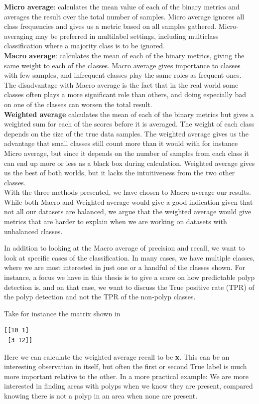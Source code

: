 \textbf{Micro average}: calculates the mean value of each of the binary metrics and averages the result over the total number of samples. 
Micro average ignores all class frequencies and gives us a metric based on all samples gathered. Micro-averaging may be preferred in multilabel settings, including multiclass classification where a majority class is to be ignored.\\

\textbf{Macro average}: calculates the mean of each of the binary metrics, giving the same weight to each of the classes. Macro average gives importance to classes with few samples, and infrequent classes play the same roles as frequent ones. The disadvantage with Macro average is the fact that in the real world some classes often plays a more significant role than others, and doing especially bad on one of the classes can worsen the total result. \\

\textbf{Weighted average} calculates the mean of each of the binary metrics but gives a weighted sum for each of the scores before it is averaged. 
The weight of each class depends on the size of the true data samples.
The weighted average gives us the advantage that small classes still count more than it would with for instance Micro average, but since it depends on the number of samples from each class it can end up more or less as a black box during calculation.
Weighted average gives us the best of both worlds, but it lacks the intuitiveness from the two other classes. \\

With the three methods presented, we have chosen to Macro average our results. While both Macro and Weighted average would give a good indication given that not all our datasets are balanced, we argue that the weighted average would give metrics that are harder to explain when we are working on datasets with unbalanced classes.

In addition to looking at the Macro average of precision and recall, we want to look at specific cases of the classification.  In many cases, we have multiple classes, where we are most interested in just one or a handful of the classes shown. 
For instance, a focus we have in this thesis is to give a score on how predictable polyp detection is, and on that case, we want to discuss the True positive rate (TPR) of the polyp detection and not the TPR of the non-polyp classes. 

Take for instance the matrix shown in \\
\begin{verbatim}
[[10 1]
 [3 12]]
\end{verbatim}
Here we can calculate the weighted average recall to be \textbf{x}. This can be an interesting observation in itself, but often the first or second True label is much more important relative to the other.  In a more practical example: We are more interested in finding areas with polyps when we know they are present, compared knowing there is not a polyp in an area when none are present. 


